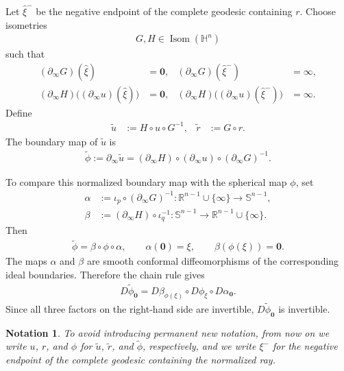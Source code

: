 \documentclass[11pt]{amsart}
\newcommand{\SuggestedDelete}[1]{{\hypersetup{linkcolor=red,citecolor=red,urlcolor=red}\color{red}#1}}
\newcommand{\ReviewUnusedLabel}[1]{%
  \par\noindent
  \SuggestedDelete{\textup{\scriptsize Unused label: \texttt{\detokenize{\label{#1}}}}}%
  \par}
\theoremstyle{plain}
\theoremstyle{plain}
\newtheorem{notation}[theorem]{Notation}
\theoremstyle{plain}
\newcommand{\Hn}{\mathbb H^n}
\newcommand{\bdry}{\partial_\infty}
\newcommand{\R}{\mathbb R}
\numberwithin{equation}{section}
\begin{document}
Let \(\widehat\xi^{-}\) be the negative endpoint of the complete
geodesic containing \(r\).  Choose isometries
\begin{align}
G,H\in\operatorname{Isom}(\Hn)
\nonumber
\end{align}
such that
\begin{align}
(\bdry G)(\widehat\xi)
&= \mathbf{0},
&
(\bdry G)(\widehat\xi^{-})
&=\infty,
\nonumber\\
(\bdry H)\bigl((\bdry u)(\widehat\xi)\bigr)
&=\mathbf{0},
&
(\bdry H)\bigl((\bdry u)(\widehat\xi^{-})\bigr)
&=\infty.
\nonumber
\end{align}
Define
\begin{align}
\widetilde u
&:=
H\circ u\circ G^{-1},
&
\widetilde r
&:=
G\circ r.
\nonumber
\end{align}
The boundary map of \(\widetilde u\) is
\begin{align}
\widetilde\phi
:=
\bdry\widetilde u
=
(\bdry H)\circ(\bdry u)\circ(\bdry G)^{-1}.
\nonumber
\end{align}

To compare this normalized boundary map with the spherical map
\(\phi\), set
\begin{align}
\alpha
&:=
\iota_p\circ(\bdry G)^{-1}:
\R^{n-1}\cup\{\infty\}
\longrightarrow
\mathbb S^{n-1},
\nonumber\\
\beta
&:=
(\bdry H)\circ\iota_q^{-1}:
\mathbb S^{n-1}
\longrightarrow
\R^{n-1}\cup\{\infty\}.
\nonumber
\end{align}
Then
\begin{align}
\widetilde\phi
=
\beta\circ\phi\circ\alpha,
\qquad
\alpha(\mathbf{0})=\xi,
\qquad
\beta(\phi(\xi))=\mathbf{0}.
\nonumber
\end{align}
The maps \(\alpha\) and \(\beta\) are smooth conformal
diffeomorphisms of the corresponding ideal boundaries.  Therefore the
chain rule gives
\begin{align}
D\widetilde\phi_{\mathbf{0}}
=
D\beta_{\phi(\xi)}
\circ
D\phi_\xi
\circ
D\alpha_{\mathbf{0}}.
\nonumber
\end{align}
Since all three factors on the right-hand side are invertible,
\(D\widetilde\phi_{\mathbf{0}}\) is invertible.

\begin{notation}
{To avoid introducing permanent new notation, from now on we write
\(u\), \(r\), and \(\phi\) for
\(\widetilde u\), \(\widetilde r\), and \(\widetilde\phi\),
respectively, and we write \(\xi^{-}\) for the negative endpoint of the
complete geodesic containing the normalized ray.  
}
\end{notation}
\end{document}
